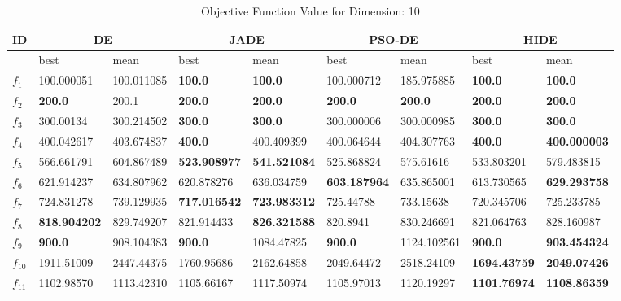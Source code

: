 \begingroup
\renewcommand\arraystretch{0.7}
\begin{table*}[t!]
\centering
\caption{Objective Function Value for Dimension: 10}
 \begin{tabular}{|p{0.8cm}|p{1.6cm}|p{1.6cm}|p{1.6cm}|p{1.6cm}|p{1.6cm}|p{1.6cm}|p{1.6cm}|p{1.6cm}|} 
 \hline
 ID & \multicolumn{2}{c|}{DE} & \multicolumn{2}{c|}{JADE} & \multicolumn{2}{c|}{PSO-DE} & \multicolumn{2}{c|}{HIDE} \\
 \hline
    & best & mean & best & mean & best & mean & best & mean \\ [0.5ex] 
 \hline
$f_1$  & 100.000051 & 100.011085 & \textbf{100.0} & \textbf{100.0} & 100.000712 & 185.975885 & \textbf{100.0} & \textbf{100.0} \\ 
$f_2$  & \textbf{200.0} & 200.1 & \textbf{200.0} & \textbf{200.0} & \textbf{200.0} & \textbf{200.0} & \textbf{200.0} & \textbf{200.0} \\ 
$f_3$  & 300.00134 & 300.214502 & \textbf{300.0} & \textbf{300.0} & 300.000006 & 300.000985 & \textbf{300.0} & \textbf{300.0} \\ 
$f_4$  & 400.042617 & 403.674837 & \textbf{400.0} & 400.409399 & 400.064644 & 404.307763 & \textbf{400.0} & \textbf{400.000003} \\ 
$f_5$  & 566.661791 & 604.867489 & \textbf{523.908977} & \textbf{541.521084} & 525.868824 & 575.61616 & 533.803201 & 579.483815 \\ 
$f_6$  & 621.914237 & 634.807962 & 620.878276 & 636.034759 & \textbf{603.187964} & 635.865001 & 613.730565 & \textbf{629.293758} \\ 
$f_7$  & 724.831278 & 739.129935 & \textbf{717.016542} & \textbf{723.983312} & 725.44788 & 733.15638 & 720.345706 & 725.233785 \\ 
$f_8$  & \textbf{818.904202} & 829.749207 & 821.914433 & \textbf{826.321588} & 820.8941 & 830.246691 & 821.064763 & 828.160987 \\ 
$f_9$  & \textbf{900.0} & 908.104383 & \textbf{900.0} & 1084.47825 & \textbf{900.0} & 1124.102561 & \textbf{900.0} & \textbf{903.454324} \\ 
$f_{10}$  & 1911.51009 & 2447.44375 & 1760.95686 & 2162.64858 & 2049.64472 & 2518.24109 & \textbf{1694.43759} & \textbf{2049.07426} \\ 
$f_{11}$  & 1102.98570 & 1113.42310 & 1105.66167 & 1117.50974 & 1105.97013 & 1120.19297 & \textbf{1101.76974} & \textbf{1108.86359} \\ 

\end{tabular}
\end{table*}
